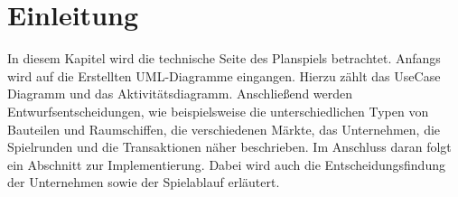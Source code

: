 \section{Einleitung}
\label{sec:fachkonzept-einleitung}


In diesem Kapitel wird die technische Seite des Planspiels betrachtet. Anfangs wird auf die Erstellten UML-Diagramme eingangen. Hierzu zählt das UseCase Diagramm und das Aktivitätsdiagramm. Anschließend werden Entwurfsentscheidungen, wie beispielsweise die unterschiedlichen Typen von Bauteilen und Raumschiffen, die verschiedenen Märkte, das Unternehmen, die Spielrunden und die Transaktionen näher beschrieben. Im Anschluss daran folgt ein Abschnitt zur Implementierung. Dabei wird auch die Entscheidungsfindung der Unternehmen sowie der Spielablauf erläutert. 

\autorende{}